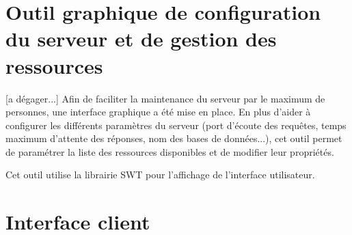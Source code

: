 \documentclass[a4paper,11pt]{article}
\begin{document}
\section{Outil graphique de configuration du serveur et de gestion des ressources}
	[a dégager...]
    Afin de faciliter la maintenance du serveur par le maximum de personnes, une interface graphique a été mise en place. En plus d'aider à configurer les différents paramètres du serveur (port d'écoute des requêtes, temps maximum d'attente des réponses, nom des bases de données...), cet outil permet de paramétrer la liste des ressources disponibles et de modifier leur propriétés.

    Cet outil utilise la librairie SWT pour l'affichage de l'interface utilisateur.

\section{Interface client}
	
\end{document}
